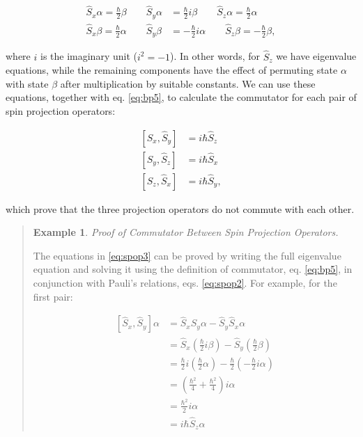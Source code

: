 \documentclass[
  english,
  9pt,
]{extbook}
\theoremstyle{definition}
\theoremstyle{definition}
\newtheorem{example}{Example}[chapter]
\theoremstyle{definition}
\theoremstyle{definition}
\theoremstyle{remark}
\begin{document}
\begin{equation}
\begin{aligned}
\hat{S}_x \alpha =  \frac{\hbar}{2} \beta \qquad \hat{S}_y \alpha &=  \frac{\hbar}{2} i \beta \qquad \hat{S}_z \alpha =  \frac{\hbar}{2} \alpha \\
\hat{S}_x \beta =  \frac{\hbar}{2} \alpha \qquad \hat{S}_y \beta &=  - \frac{\hbar}{2} i \alpha \qquad \hat{S}_z \beta =  -\frac{\hbar}{2} \beta,
\end{aligned}
\label{eq:spop2}  
\end{equation}

where \(i\) is the imaginary unit (\(i^2=-1\)). In other words, for \(\hat{S}_z\) we have eigenvalue equations, while the remaining components have the effect of permuting state \(\alpha\) with state \(\beta\) after multiplication by suitable constants. We can use these equations, together with eq. \eqref{eq:bp5}, to calculate the commutator for each pair of spin projection operators:

\begin{equation}
\begin{aligned}
\left[\hat{S}_x, \hat{S}_y\right] &= i\hbar\hat{S}_z \\
\left[\hat{S}_y, \hat{S}_z\right] &= i\hbar\hat{S}_x \\
\left[\hat{S}_z, \hat{S}_x\right] &= i\hbar\hat{S}_y,
\end{aligned}
\label{eq:spop3}  
\end{equation}

which prove that the three projection operators do not commute with each other.

\begin{quote}
\begin{example}
\protect\hypertarget{exm:spinex1}{}\label{exm:spinex1}\emph{Proof of Commutator Between Spin Projection Operators.}

The equations in \eqref{eq:spop3} can be proved by writing the full eigenvalue equation and solving it using the definition of commutator, eq. \eqref{eq:bp5}, in conjunction with Pauli's relations, eqs. \eqref{eq:spop2}. For example, for the first pair:

\begin{equation}
\begin{aligned}
\left[\hat{S}_x, \hat{S}_y\right] \alpha &= \hat{S}_x\hat{S}_y\alpha-\hat{S}_y\hat{S}_x\alpha \\
&= \hat{S}_x \left(\frac{\hbar}{2}i \beta \right)-\hat{S}_y \left(\frac{\hbar}{2} \beta \right) \\
&= \frac{\hbar}{2}i \left(\frac{\hbar}{2} \alpha \right)- \frac{\hbar}{2} \left(-\frac{\hbar}{2}i \alpha \right) \\
&= \left(\frac{\hbar^2}{4}+\frac{\hbar^2}{4}\right)i\alpha \\
&= \frac{\hbar^2}{2}i \alpha \\
&= i\hbar\hat{S}_z  \alpha 
\end{aligned}
\label{eq:spop4} 
\end{equation}
\end{example}
\end{quote}
\end{document}
